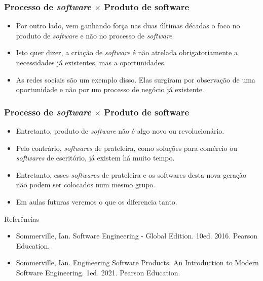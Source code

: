\documentclass[11pt]{beamer}
\begin{document}
    \begin{frame}
      \frametitle{Processo de \textit{software} $\times$ Produto de software}
      \begin{itemize}
        \item Por outro lado, vem ganhando força nas duas últimas décadas o foco no produto de \textit{software} e não no processo de \textit{software}.
        \item Isto quer dizer, a criação de \textit{software} é não atrelada obrigatoriamente a necessidades já existentes, mas a oportunidades.
        \item As redes sociais são um exemplo disso. Elas surgiram por observação de uma oportunidade e não por um processo de negócio já existente.
      \end{itemize}
    \end{frame}

    \begin{frame}
      \frametitle{Processo de \textit{software} $\times$ Produto de software}
      \begin{itemize}
        \item Entretanto, produto de \textit{software} não é algo novo ou revolucionário.
        \item Pelo contrário, \textit{softwares} de prateleira, como soluções para comércio ou \textit{softwares} de escritório, já existem há muito tempo.
        \item Entretanto, esses \textit{softwares} de prateleira e os softwares desta nova geração não podem ser colocados num mesmo grupo.
        \item Em aulas futuras veremos o que os diferencia tanto.
      \end{itemize}
    \end{frame}

    \begin{frame}{Referências}
      \begin{itemize}
          \item Sommerville, Ian. Software Engineering - Global Edition. 10ed. 2016. Pearson Education.
          \item Sommerville, Ian. Engineering Software Products: An Introduction to Modern Software Engineering. 1ed. 2021. Pearson Education. 
      \end{itemize}
   \end{frame}
\end{document}
